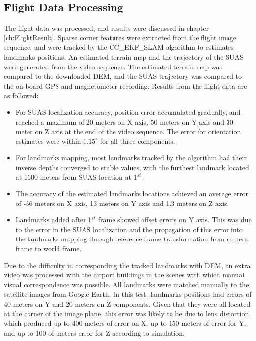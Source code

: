 \subsection{Flight Data Processing}
The flight data was processed, and results were discussed in chapter
\ref{ch:FlightResult}. Sparse corner features were extracted from the
flight image sequence, and were tracked by the CC\_EKF\_SLAM algorithm
to estimates landmarks positions. An estimated terrain map and the
trajectory of the SUAS were generated from the video sequence. The
estimated terrain map was compared to the downloaded DEM, and the SUAS
trajectory was compared to the on-board GPS and magnetometer
recording. Results from the flight data are as followed:
\begin{itemize}
  \item For SUAS localization accuracy, position error accumulated
  gradually, and reached a maximum of 20 meters on X axis, 50 meters
  on Y axis and 30 meter on Z axis at the end of the video sequence.
  The error for orientation estimates were within $1.15^\circ$ for all
  three components.
  \item For landmarks mapping,  most landmarks tracked by the
  algorithm had their inverse depths converged to stable values, with the
  furthest landmark located at 1600 meters from SUAS location at 1$^{st}$.
  \item The accuracy of the estimated landmarks locations achieved an
  average error of -56 meters on X axis, 13 meters on Y axis and 1.3
  meters on Z axis.
  \item Landmarks added after 1$^{st}$ frame showed offset errors on Y
  axis. This was due to the error in the SUAS localization and the
  propagation of this error into the landmarks mapping through
  reference frame transformation from camera frame to world frame.
\end{itemize}

Due to the difficulty in corresponding the tracked landmarks with DEM,
an extra video was processed with the airport buildings in the scenes
with which manual visual correspondence was possible. All landmarks
were matched manually to the satellite images from Google Earth. In
this test, landmarks positions had errors of 40 meters on Y and 20
meters on Z components. Given that they were all located at the corner
of the image plane, this error was likely to be due to lens
distortion, which produced up to 400 meters of error on X, up to 150
meters of error for Y, and up to 100 of meters error for Z according
to simulation.

